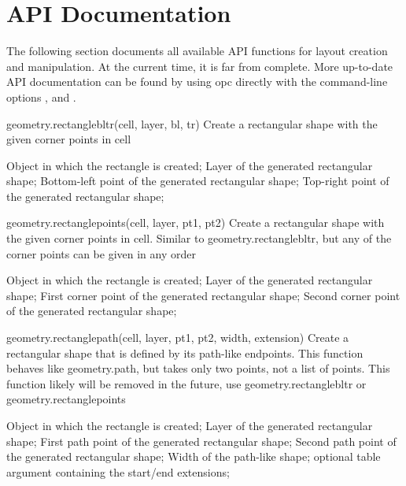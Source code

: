 \cleardoublepage

\section{API Documentation}

The following section documents all available API functions for layout creation and manipulation.
At the current time, it is far from complete.
More up-to-date API documentation can be found by using opc directly with the command-line options ,  and .

\begin{APIfunc}{geometry.rectanglebltr(cell, layer, bl, tr)}
    Create a rectangular shape with the given corner points in cell
    \begin{APIparameters}
            Object in which the rectangle is created;
            Layer of the generated rectangular shape;
            Bottom-left point of the generated rectangular shape;
            Top-right point of the generated rectangular shape;
    \end{APIparameters}
\end{APIfunc}
\begin{APIfunc}{geometry.rectanglepoints(cell, layer, pt1, pt2)}
    Create a rectangular shape with the given corner points in cell. Similar to geometry.rectanglebltr, but any of the corner points can be given in any order
    \begin{APIparameters}
            Object in which the rectangle is created;
            Layer of the generated rectangular shape;
            First corner point of the generated rectangular shape;
            Second corner point of the generated rectangular shape;
    \end{APIparameters}
\end{APIfunc}
\begin{APIfunc}{geometry.rectanglepath(cell, layer, pt1, pt2, width, extension)}
    Create a rectangular shape that is defined by its path-like endpoints. This function behaves like geometry.path, but takes only two points, not a list of points. This function likely will be removed in the future, use geometry.rectanglebltr or geometry.rectanglepoints
    \begin{APIparameters}
            Object in which the rectangle is created;
            Layer of the generated rectangular shape;
            First path point of the generated rectangular shape;
            Second path point of the generated rectangular shape;
            Width of the path-like shape;
            optional table argument containing the start/end extensions;
    \end{APIparameters}
\end{APIfunc}

